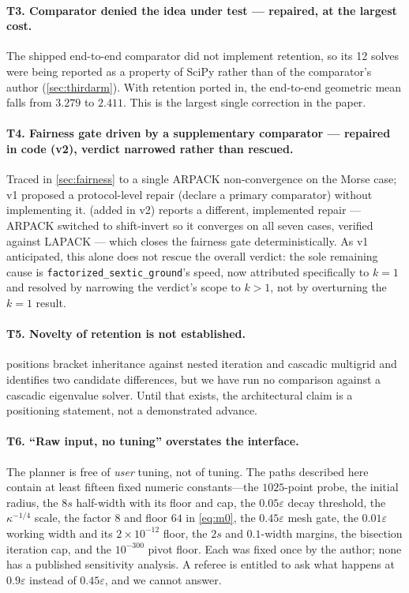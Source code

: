 \documentclass[twocolumn,10pt,a4paper]{article}
\theoremstyle{plain}
\theoremstyle{definition}
\newcommand{\eps}{\varepsilon}
\begin{document}
\paragraph{T3. Comparator denied the idea under test ---
\textbf{repaired}, at the largest cost.} The shipped end-to-end comparator did
not implement retention, so its 12 solves were being reported as a property of
SciPy rather than of the comparator's author (\cref{sec:thirdarm}). With
retention ported in, the end-to-end geometric mean falls from $3.279$ to
$2.411$. This is the largest single correction in the paper.

\paragraph{T4. Fairness gate driven by a supplementary comparator ---
\textbf{repaired in code (v2), verdict narrowed rather than rescued}.}
Traced in \cref{sec:fairness} to a single ARPACK non-convergence on the
Morse case; v1 proposed a protocol-level repair (declare a primary
comparator) without implementing it.  (added in v2)
reports a different, implemented repair --- ARPACK switched to shift-invert
so it converges on all seven cases, verified against LAPACK --- which closes
the fairness gate deterministically. As v1 anticipated, this alone does not
rescue the overall verdict: the sole remaining cause is
\texttt{factorized\_sextic\_ground}'s speed, now attributed specifically to
$k=1$ and resolved by narrowing the verdict's scope to $k>1$, not by
overturning the $k=1$ result.

\paragraph{T5. Novelty of retention is not established.}
 positions bracket inheritance against nested iteration and
cascadic multigrid \citep{bornemann1996,trottenberg2001} and identifies two
candidate differences, but we have run no comparison against a cascadic
eigenvalue solver. Until that exists, the architectural claim is a positioning
statement, not a demonstrated advance.

\paragraph{T6. ``Raw input, no tuning'' overstates the interface.}
The planner is free of \emph{user} tuning, not of tuning. The paths described
here contain at least fifteen fixed numeric constants---the $1025$-point probe,
the initial radius, the $8s$ half-width with its floor and cap, the $0.05\eps$
decay threshold, the $\kappa^{-1/4}$ scale, the factor $8$ and floor $64$ in
\eqref{eq:m0}, the $0.45\eps$ mesh gate, the $0.01\eps$ working width and its
$2\times10^{-12}$ floor, the $2s$ and $0.1$-width margins, the bisection
iteration cap, and the $10^{-300}$ pivot floor. Each was fixed once by the
author; none has a published sensitivity analysis. A referee is entitled to ask
what happens at $0.9\eps$ instead of $0.45\eps$, and we cannot answer.
\end{document}

